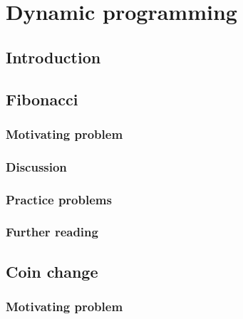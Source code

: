 \section{Dynamic programming}

\subsection{Introduction}

\subsection{Fibonacci}

\subsubsection*{Motivating problem}







\subsubsection*{Discussion}

\subsubsection*{Practice problems}

\subsubsection*{Further reading}

\subsection{Coin change}

\subsubsection*{Motivating problem}



